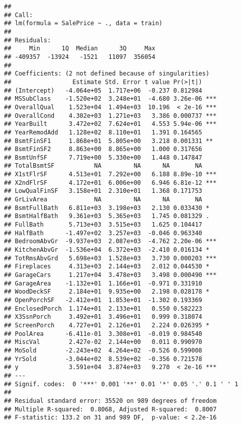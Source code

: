 \documentclass[
]{article}
\begin{document}
\begin{verbatim}
## 
## Call:
## lm(formula = SalePrice ~ ., data = train)
## 
## Residuals:
##     Min      1Q  Median      3Q     Max 
## -409357  -13924   -1521   11097  356054 
## 
## Coefficients: (2 not defined because of singularities)
##                 Estimate Std. Error t value Pr(>|t|)    
## (Intercept)   -4.064e+05  1.717e+06  -0.237 0.812984    
## MSSubClass    -1.520e+02  3.248e+01  -4.680 3.26e-06 ***
## OverallQual    1.523e+04  1.494e+03  10.196  < 2e-16 ***
## OverallCond    4.302e+03  1.271e+03   3.386 0.000737 ***
## YearBuilt      3.472e+02  7.624e+01   4.553 5.94e-06 ***
## YearRemodAdd   1.128e+02  8.110e+01   1.391 0.164565    
## BsmtFinSF1     1.868e+01  5.805e+00   3.218 0.001331 ** 
## BsmtFinSF2     8.863e+00  8.865e+00   1.000 0.317656    
## BsmtUnfSF      7.719e+00  5.330e+00   1.448 0.147847    
## TotalBsmtSF           NA         NA      NA       NA    
## X1stFlrSF      4.513e+01  7.292e+00   6.188 8.89e-10 ***
## X2ndFlrSF      4.172e+01  6.006e+00   6.946 6.81e-12 ***
## LowQualFinSF   3.158e+01  2.310e+01   1.368 0.171753    
## GrLivArea             NA         NA      NA       NA    
## BsmtFullBath   6.811e+03  3.198e+03   2.130 0.033430 *  
## BsmtHalfBath   9.361e+03  5.365e+03   1.745 0.081329 .  
## FullBath       5.713e+03  3.515e+03   1.625 0.104417    
## HalfBath      -1.497e+02  3.257e+03  -0.046 0.963340    
## BedroomAbvGr  -9.937e+03  2.087e+03  -4.762 2.20e-06 ***
## KitchenAbvGr  -1.536e+04  6.372e+03  -2.410 0.016134 *  
## TotRmsAbvGrd   5.698e+03  1.528e+03   3.730 0.000203 ***
## Fireplaces     4.313e+03  2.144e+03   2.012 0.044530 *  
## GarageCars     1.217e+04  3.478e+03   3.498 0.000490 ***
## GarageArea    -1.132e+01  1.166e+01  -0.971 0.331910    
## WoodDeckSF     2.184e+01  9.935e+00   2.198 0.028178 *  
## OpenPorchSF   -2.412e+01  1.853e+01  -1.302 0.193369    
## EnclosedPorch  1.174e+01  2.133e+01   0.550 0.582223    
## X3SsnPorch     3.492e+01  3.496e+01   0.999 0.318074    
## ScreenPorch    4.727e+01  2.126e+01   2.224 0.026395 *  
## PoolArea      -6.411e-01  3.308e+01  -0.019 0.984540    
## MiscVal        2.427e-02  2.144e+00   0.011 0.990970    
## MoSold        -2.243e+02  4.264e+02  -0.526 0.599008    
## YrSold        -3.044e+02  8.539e+02  -0.356 0.721578    
## y              3.591e+04  3.874e+03   9.270  < 2e-16 ***
## ---
## Signif. codes:  0 '***' 0.001 '**' 0.01 '*' 0.05 '.' 0.1 ' ' 1
## 
## Residual standard error: 35520 on 989 degrees of freedom
## Multiple R-squared:  0.8068, Adjusted R-squared:  0.8007 
## F-statistic: 133.2 on 31 and 989 DF,  p-value: < 2.2e-16
\end{verbatim}
\end{document}
